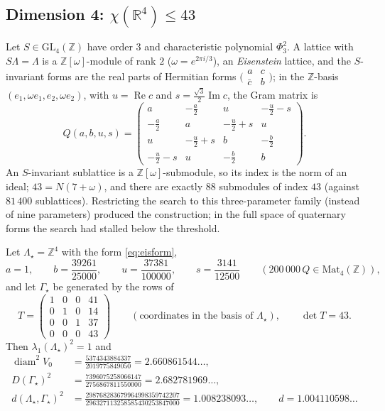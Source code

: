 \documentclass[10pt]{article}
\theoremstyle{plain}
\theoremstyle{remark}
\newcommand{\R}{\mathbb{R}}
\newcommand{\Z}{\mathbb{Z}}
\newcommand{\diam}{\operatorname{diam}}
\begin{document}
\subsection{Dimension 4: $\chi(\R^4)\le43$}\label{ssec:43}

Let $S\in\mathrm{GL}_4(\Z)$ have order $3$ and characteristic polynomial
$\Phi_3^2$. A lattice with $S\Lambda=\Lambda$ is a $\Z[\omega]$-module of
rank $2$ ($\omega=e^{2\pi i/3}$), an \emph{Eisenstein} lattice, and the
$S$-invariant forms are the real parts of Hermitian forms
$\bigl(\begin{smallmatrix}a&c\\ \bar c&b\end{smallmatrix}\bigr)$; in the
$\Z$-basis $(e_1,\omega e_1,e_2,\omega e_2)$, with $u=\operatorname{Re}c$
and $s=\tfrac{\sqrt3}{2}\operatorname{Im}c$, the Gram matrix is
\begin{equation}\label{eq:eisform}
Q(a,b,u,s)=\begin{pmatrix}
a & -\tfrac a2 & u & -\tfrac u2-s\\[1pt]
-\tfrac a2 & a & -\tfrac u2+s & u\\[1pt]
u & -\tfrac u2+s & b & -\tfrac b2\\[1pt]
-\tfrac u2-s & u & -\tfrac b2 & b
\end{pmatrix}.
\end{equation}
An $S$-invariant sublattice is a $\Z[\omega]$-submodule, so its index is the
norm of an ideal; $43=N(7+\omega)$, and there are exactly $88$ submodules
of index $43$ (against $81\,400$ sublattices). Restricting the search to
this three-parameter family (instead of nine parameters) produced the
construction; in the full space of quaternary forms the search had stalled
below the threshold.

Let $\Lambda_\star=\Z^4$ with the form \eqref{eq:eisform},
\begin{equation}\label{eq:gram43}
a=1,\qquad b=\frac{39261}{25000},\qquad u=\frac{37381}{100000},\qquad
s=\frac{3141}{12500}\qquad(200\,000\,Q\in\mathrm{Mat}_4(\Z)),
\end{equation}
and let $\Gamma_\star$ be generated by the rows of
\begin{equation}\label{eq:hnf43}
T=\begin{pmatrix}1&0&0&41\\0&1&0&14\\0&0&1&37\\0&0&0&43\end{pmatrix}
\qquad(\text{coordinates in the basis of }\Lambda_\star),\qquad\det T=43 .
\end{equation}
Then $\lambda_1(\Lambda_\star)^2=1$ and
\[
\begin{aligned}
\diam^2V_0&=\frac{5374343884337}{2019775849050}=2.660861544\ldots,\\
D(\Gamma_\star)^2&=\frac{7396075258066147}{2756867811550000}=2.682781969\ldots,\\
d(\Lambda_\star,\Gamma_\star)^2
&=\frac{298768283679964998359742207}{296327113258585430253847000}
=1.008238093\ldots,\qquad d=1.004110598\ldots
\end{aligned}
\]
\end{document}
